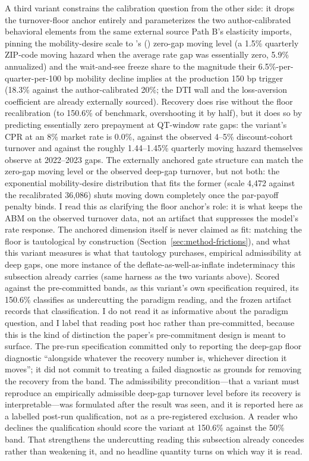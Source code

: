 \documentclass[12pt]{article}
\newcommand{\citepos}[1]{\citeauthor{#1}'s (\citeyear{#1})}
\begin{document}
A third variant constrains the calibration question from the other side: it drops the turnover-floor anchor entirely and parameterizes the two author-calibrated behavioral elements from the same external source Path B's elasticity imports, pinning the mobility-desire scale to \citepos{liebersohn2024} zero-gap moving level (a 1.5\% quarterly ZIP-code moving hazard when the average rate gap was essentially zero, 5.9\% annualized) and the wait-and-see freeze share to the magnitude their 6.5\%-per-quarter-per-100 bp mobility decline implies at the production 150 bp trigger (18.3\% against the author-calibrated 20\%; the DTI wall and the loss-aversion coefficient are already externally sourced). Recovery does rise without the floor recalibration (to 150.6\% of benchmark, overshooting it by half), but it does so by predicting essentially zero prepayment at QT-window rate gaps: the variant's CPR at an 8\% market rate is 0.0\%, against the observed 4--5\% discount-cohort turnover and against the roughly 1.44--1.45\% quarterly moving hazard \citet{liebersohn2024} themselves observe at 2022--2023 gaps. The externally anchored gate structure can match the zero-gap moving level or the observed deep-gap turnover, but not both: the exponential mobility-desire distribution that fits the former (scale 4{,}472 against the recalibrated 36{,}086) shuts moving down completely once the par-payoff penalty binds. I read this as clarifying the floor anchor's role: it is what keeps the ABM on the observed turnover data, not an artifact that suppresses the model's rate response. The anchored dimension itself is never claimed as fit: matching the floor is tautological by construction (Section~\ref{sec:method-frictions}), and what this variant measures is what that tautology purchases, empirical admissibility at deep gaps, one more instance of the deflate-as-well-as-inflate indeterminacy this subsection already carries (same harness as the two variants above). Scored against the pre-committed bands, as this variant's own specification required, its 150.6\% classifies as undercutting the paradigm reading, and the frozen artifact records that classification. I do not read it as informative about the paradigm question, and I label that reading post hoc rather than pre-committed, because this is the kind of distinction the paper's pre-commitment design is meant to surface. The pre-run specification committed only to reporting the deep-gap floor diagnostic ``alongside whatever the recovery number is, whichever direction it moves''; it did not commit to treating a failed diagnostic as grounds for removing the recovery from the band. The admissibility precondition---that a variant must reproduce an empirically admissible deep-gap turnover level before its recovery is interpretable---was formulated after the result was seen, and it is reported here as a labelled post-run qualification, not as a pre-registered exclusion. A reader who declines the qualification should score the variant at 150.6\% against the 50\% band. That strengthens the undercutting reading this subsection already concedes rather than weakening it, and no headline quantity turns on which way it is read.
\end{document}
